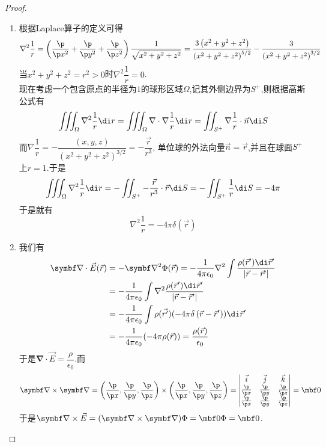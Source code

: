 \documentclass{ctexart}
\begin{document}
\begin{proof}
    \begin{enumerate}[label=(\alph*)]
        \item 根据Laplace算子的定义可得
        \[\nabla^2\dfrac{1}{r}=\left(\dfrac{\p}{\p x^2}+\dfrac{\p}{\p y^2}+\dfrac{\p}{\p z^2}\right)\dfrac{1}{\sqrt{x^2+y^2+z^2}}=\dfrac{3\left(x^2+y^2+z^2\right)}{\left(x^2+y^2+z^2\right)^{5/2}}-\dfrac{3}{\left(x^2+y^2+z^2\right)^{3/2}}\]
        当$x^2+y^2+z^2=r^2>0$时$\nabla^2\dfrac1r=0$.\\
        现在考虑一个包含原点的半径为$1$的球形区域$\Omega$,记其外侧边界为$S^+$,则根据高斯公式有
        \[\iiint_{\Omega}\nabla^2\dfrac{1}{r}\di r=\iiint_{\Omega}\nabla\cdot\nabla\dfrac{1}{r}\di r=\iint_{S^+}\nabla\dfrac{1}{r}\cdot\vec{n}\di S\]
        而$\nabla\dfrac1r=-\dfrac{(x,y,z)}{\left(x^2+y^2+z^2\right)^{3/2}}=-\dfrac{\vec{r}}{r^3}$, 单位球的外法向量$\vec{n}=\vec{r}$,并且在球面$S^+$上$r=1$.于是
        \[\iiint_{\Omega}\nabla^2\dfrac{1}{r}\di r=-\iint_{S^+}-\dfrac{\vec{r}}{r^3}\cdot\vec{r}\di S=-\iint_{S^+}\dfrac{1}{r}\di S=-4\pi\]
        于是就有
        \[\nabla^2\dfrac{1}{r}=-4\pi\delta(\vec{r})\]
        \item 我们有
        \[\begin{aligned}
            \symbf\nabla\cdot\vec{E}(\vec{r})
            &=-\symbf\nabla^2\Phi(\vec{r})=-\dfrac{1}{4\pi\epsilon_0}\nabla^2\int\dfrac{\rho(\vec{r}')\di\vec{r}'}{\left|\vec{r}-\vec{r}'\right|}\\
            &=-\dfrac{1}{4\pi\epsilon_0}\int\nabla^2\dfrac{\rho(\vec{r}')\di\vec{r}'}{\left|\vec{r}-\vec{r}'\right|}\\
            &=-\dfrac{1}{4\pi\epsilon_0}\int\rho(\vec{r'})(-4\pi\delta\left(\vec{r}-\vec{r}'\right))\di\vec{r}'\\
            &=-\dfrac{1}{4\pi\epsilon_0}(-4\pi\rho(\vec{r}))=\dfrac{\rho(\vec{r})}{\epsilon_0}
        \end{aligned}\]
        于是$\symbf\nabla\cdot\vec{E}=\dfrac{\rho}{\epsilon_0}$.而
        \[\symbf\nabla\times\symbf\nabla=\left(\dfrac{\p}{\p x},\dfrac{\p}{\p y},\dfrac{\p}{\p z}\right)\times\left(\dfrac{\p}{\p x},\dfrac{\p}{\p y},\dfrac{\p}{\p z}\right)=\begin{vmatrix}
            \vec{i}&\vec{j}&\vec{k}\\
            \frac{\p}{\p x}&\frac{\p}{\p y}&\frac{\p}{\p z}\\
            \frac{\p}{\p x}&\frac{\p}{\p y}&\frac{\p}{\p z}
        \end{vmatrix}=\mbf0\]
        于是$\symbf\nabla\times\vec{E}=(\symbf\nabla\times\symbf\nabla)\Phi=\mbf0\Phi=\mbf0$.
    \end{enumerate}
\end{proof}
\end{document}
